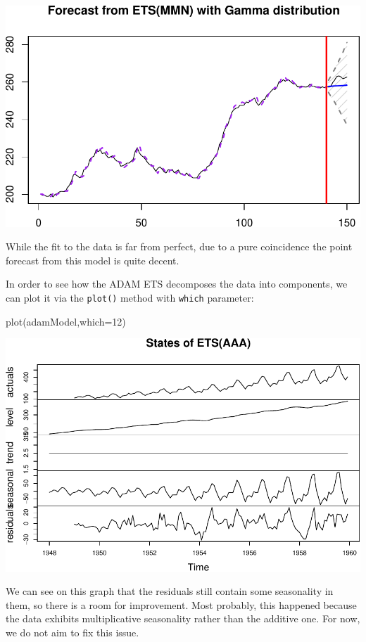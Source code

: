 \documentclass[
]{book}
\newenvironment{Shaded}{\begin{snugshade}}{\end{snugshade}}
\newcommand{\AttributeTok}[1]{\textcolor[rgb]{0.77,0.63,0.00}{#1}}
\newcommand{\DecValTok}[1]{\textcolor[rgb]{0.00,0.00,0.81}{#1}}
\newcommand{\FunctionTok}[1]{\textcolor[rgb]{0.00,0.00,0.00}{#1}}
\newcommand{\NormalTok}[1]{#1}
\theoremstyle{definition}
\theoremstyle{definition}
\theoremstyle{definition}
\theoremstyle{definition}
\theoremstyle{remark}
\begin{document}
\includegraphics{adam_files/figure-latex/unnamed-chunk-33-1.pdf}

While the fit to the data is far from perfect, due to a pure coincidence the point forecast from this model is quite decent.

In order to see how the ADAM ETS decomposes the data into components, we can plot it via the \texttt{plot()} method with \texttt{which} parameter:

\begin{Shaded}
\begin{Highlighting}[]
\FunctionTok{plot}\NormalTok{(adamModel,}\AttributeTok{which=}\DecValTok{12}\NormalTok{)}
\end{Highlighting}
\end{Shaded}

\includegraphics{adam_files/figure-latex/unnamed-chunk-34-1.pdf}

We can see on this graph that the residuals still contain some seasonality in them, so there is a room for improvement. Most probably, this happened because the data exhibits multiplicative seasonality rather than the additive one. For now, we do not aim to fix this issue.
\end{document}
